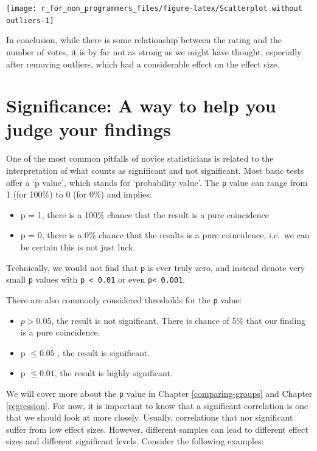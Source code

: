 \documentclass[
]{book}
\begin{document}
\begin{center}\texttt{[image: r\_for\_non\_programmers\_files/figure-latex/Scatterplot without outliers-1]} \end{center}

In conclusion, while there is some relationship between the rating and the number of votes, it is by far not as strong as we might have thought, especially after removing outliers, which had a considerable effect on the effect size.

\hypertarget{significance}{%
\section{Significance: A way to help you judge your findings}\label{significance}}

One of the most common pitfalls of novice statisticians is related to the interpretation of what counts as significant and not significant. Most basic tests offer a `p value', which stands for `probability value'. The \texttt{p} value can range from 1 (for 100\%) to 0 (for 0\%) and implies:

\begin{itemize}
\item
  p = 1, there is a 100\% chance that the result is a pure coincidence
\item
  p = 0, there is a 0\% chance that the results is a pure coincidence, i.e.~we can be certain this is not just luck.
\end{itemize}

Technically, we would not find that \texttt{p} is ever truly zero, and instead denote very small \texttt{p} values with \texttt{p\ \textless{}\ 0.01} or even \texttt{p\textless{}\ 0.001}.

There are also commonly considered thresholds for the \texttt{p} value:

\begin{itemize}
\item
  \(p > 0.05\), the result is not significant. There is chance of 5\% that our finding is a pure coincidence.
\item
  p \(\leq 0.05\) , the result is significant.
\item
  p \(\leq 0.01\), the result is highly significant.
\end{itemize}

We will cover more about the \texttt{p} value in Chapter \ref{comparing-groups} and Chapter \ref{regression}. For now, it is important to know that a significant correlation is one that we should look at more closely. Usually, correlations that nor significant suffer from low effect sizes. However, different samples can lead to different effect sizes and different significant levels. Consider the following examples:
\end{document}
